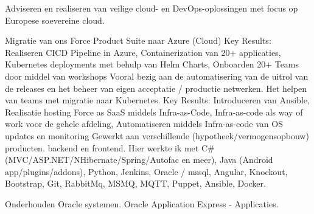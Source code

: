 \documentclass[
	a4paper
]{babelviscv}
\begin{document}
\makefrontsidebar


	\begin{cvtable}[\cvtablespace]
			{Adviseren en realiseren van veilige cloud- en DevOps-oplossingen met focus op Europese soevereine cloud.}
	\end{cvtable}
	\begin{cvtable}[\cvtablespace]
			{Migratie van ons Force Product Suite naar Azure (Cloud)}
			\cvitemlist
				{Key Results:}
					{Realiseren CICD Pipeline in Azure, Containerization van 20+ applicaties, Kubernetes deployments met behulp van Helm Charts, Onboarden 20+ Teams door middel van workshops}
			{Vooral bezig aan de automatisering van de uitrol van de releases en het beheer van eigen acceptatie / productie netwerken. Het helpen van teams met migratie naar Kubernetes.}
			\cvitemlist
				{Key Results:}
					{Introduceren van Ansible, Realisatie hosting Force as SaaS middels Infra-as-Code, Infra-as-code als way of work voor de gehele afdeling, Automatiseren middels Infra-as-code van OS updates en monitoring}
			{Gewerkt aan verschillende (hypotheek/vermogensopbouw) producten. backend en frontend. 
			\newline
			Hier werkte ik met C\# (MVC/ASP.NET/NHibernate/Spring/Autofac en meer), Java (Android app/plugins/addons), Python, Jenkins, Oracle / mssql, Angular, Knockout, Bootstrap, Git, RabbitMq, MSMQ, MQTT, Puppet, Ansible, Docker.}
	\end{cvtable}
	\begin{cvtable}[\cvtablespace]
			{Onderhouden Oracle systemen.}
			{Oracle Application Express - Applicaties.}
	\end{cvtable}
\newpage
\makebacksidebar
\end{document}
